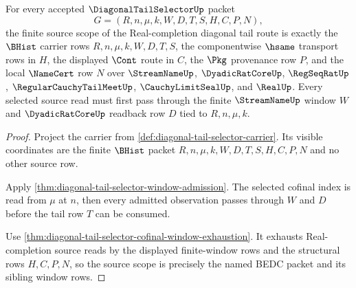 \begin{theorem}
\label{thm:diagonal-tail-selector-window-source-scope}
For every accepted $\DiagonalTailSelectorUp$ packet
$$
G=(R,n,\mu,k,W,D,T,S,H,C,P,N),
$$
the finite source scope of the Real-completion diagonal tail route is exactly
the $\BHist$ carrier rows $R,n,\mu,k,W,D,T,S$, the componentwise $\hsame$
transport rows in $H$, the displayed $\Cont$ route in $C$, the $\Pkg$
provenance row $P$, and the local $\NameCert$ row $N$ over
$\StreamNameUp$, $\DyadicRatCoreUp$, $\RegSeqRatUp$,
$\RegularCauchyTailMeetUp$, $\CauchyLimitSealUp$, and $\RealUp$.
Every selected source read must first pass through the finite
$\StreamNameUp$ window $W$ and $\DyadicRatCoreUp$ readback row $D$ tied to
$R,n,\mu,k$.
\end{theorem}
\begin{proof}
Project the carrier from \autoref{def:diagonal-tail-selector-carrier}. Its
visible coordinates are the finite $\BHist$ packet
$R,n,\mu,k,W,D,T,S,H,C,P,N$ and no other source row.

Apply \autoref{thm:diagonal-tail-selector-window-admission}. The selected
cofinal index is read from $\mu$ at $n$, then every admitted observation
passes through $W$ and $D$ before the tail row $T$ can be consumed.

Use \autoref{thm:diagonal-tail-selector-cofinal-window-exhaustion}. It
exhausts Real-completion source reads by the displayed finite-window rows and
the structural rows $H,C,P,N$, so the source scope is precisely the named
BEDC packet and its sibling window rows.
\end{proof}

